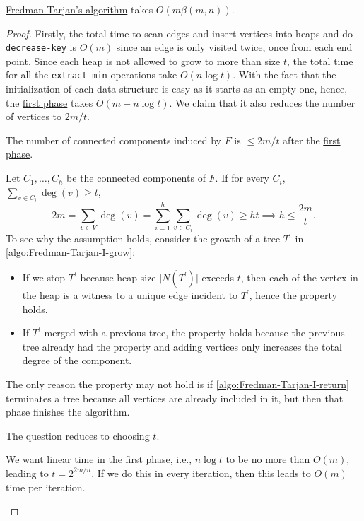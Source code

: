 \begin{theorem}\label{thm:Fredman-Tarjan}
	\hyperref[algo:Fredman-Tarjan]{Fredman-Tarjan's algorithm} takes \(O(m \beta (m, n))\).
\end{theorem}
\begin{proof}
	Firstly, the total time to scan edges and insert vertices into heaps and do \texttt{decrease-key} is \(O(m)\) since an edge is only visited twice, once from each end point. Since each heap is not allowed to grow to more than size \(t\), the total time for all the \texttt{extract-min} operations take \(O(n \log t)\). With the fact that the initialization of each data structure is easy as it starts as an empty one, hence, the \hyperref[algo:Fredman-Tarjan-I]{first phase} takes \(O(m + n \log t)\). We claim that it also reduces the number of vertices to \(2m / t\).

	\begin{claim}
		The number of connected components induced by \(F\) is \(\leq 2m / t\) after the \hyperref[algo:Fredman-Tarjan-I]{first phase}.
	\end{claim}
	\begin{explanation}
		Let \(C_1, \dots , C_h\) be the connected components of \(F\). If for every \(C_i\), \(\sum_{v \in C_i} \deg(v) \geq t\),
		\[
			2m
			= \sum_{v \in V} \deg(v)
			= \sum_{i=1}^{h} \sum_{v \in C_i} \deg(v)
			\geq ht
			\implies h \leq \frac{2m}{t}.
		\]
		To see why the assumption holds, consider the growth of a tree \(T^{\prime}\) in \autoref{algo:Fredman-Tarjan-I-grow}:
		\begin{itemize}
			\item If we stop \(T^{\prime}\) because heap size \(\lvert N(T^{\prime} ) \rvert \) exceeds \(t\), then each of the vertex in the heap is a witness to a unique edge incident to \(T^{\prime}\), hence the property holds.
			\item If \(T^{\prime}\) merged with a previous tree, the property holds because the previous tree already had the property and adding vertices only increases the total degree of the component.
		\end{itemize}
		The only reason the property may not hold is if \autoref{algo:Fredman-Tarjan-I-return} terminates a tree because all vertices are already included in it, but then that phase finishes the algorithm.
	\end{explanation}

	The question reduces to choosing \(t\).

	\begin{intuition}
		We want linear time in the \hyperref[algo:Fredman-Tarjan-I]{first phase}, i.e., \(n \log t\) to be no more than \(O(m)\), leading to \(t = 2^{2m / n}\). If we do this in every iteration, then this leads to \(O(m)\) time per iteration.
	\end{intuition}


\end{proof}
